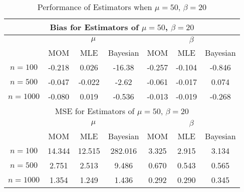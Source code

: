 \documentclass{svproc}
\begin{document}
\begin{table}[H]
\begin{center}
\caption{Performance of Estimators when $\mu = 50$, $\beta = 20$}
\begin{tabular}{|c|c|c|c|c|c|c|}
\hline
\multicolumn{7}{|c|}{Bias for Estimators of $\mu = 50$, $\beta = 20$}\\
\hline
  &\multicolumn{3}{|c|}{$\mu$} &\multicolumn{3}{|c|}{$\beta$}\\
\hline
 & MOM & MLE & Bayesian & MOM & MLE & Bayesian \\
\hline
$n = 100$ & -0.218 & 0.026 & -16.38 & -0.257 & -0.104 & -0.846\\
\hline
$n = 500$ & -0.047 & -0.022 & -2.62 & -0.061 & -0.017 & 0.074\\
\hline
$n = 1000$ & -0.080 & 0.019 & -0.536 & -0.013 & -0.019 & -0.268\\
\hline
\hline
\multicolumn{7}{|c|}{MSE for Estimators of $\mu = 50$, $\beta = 20$}\\
\hline
  &\multicolumn{3}{|c|}{$\mu$} &\multicolumn{3}{|c|}{$\beta$}\\
\hline
 & MOM & MLE & Bayesian & MOM & MLE & Bayesian \\
\hline
$n = 100$ & 14.344 & 12.515 & 282.016 & 3.325 & 2.915 & 3.134\\
\hline
$n = 500$ & 2.751 & 2.513 & 9.486 & 0.670 & 0.543 & 0.565\\
\hline
$n = 1000$ & 1.354 & 1.249 & 1.436 & 0.292 & 0.290 & 0.345\\
\hline
\end{tabular}
\medskip
\label{tab5}
\end{center}
\end{table}
\end{document}
